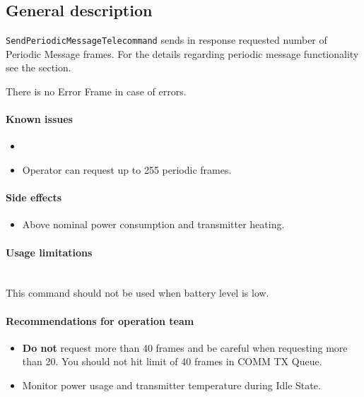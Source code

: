 

\subsection{General description}
\texttt{SendPeriodicMessageTelecommand} sends in response requested number of Periodic Message frames. 
For the details regarding periodic message functionality see the  section.

There is no Error Frame in case of errors.

\paragraph{Known issues}
\begin{itemize}
	\item {}
	\item Operator can request up to 255 periodic frames.
\end{itemize}

\paragraph{Side effects}
\begin{itemize}
	\item Above nominal power consumption and transmitter heating.
\end{itemize}

\paragraph{Usage limitations}\mbox{}\\ 
This command should not be used when battery level is low.

\paragraph{Recommendations for operation team}
\begin{itemize}
	\item \textbf{Do not} request more than 40 frames and be careful when requesting more than 20. You should not hit limit of 40 frames in COMM TX Queue.
	\item Monitor power usage and transmitter temperature during Idle State.
\end{itemize}

